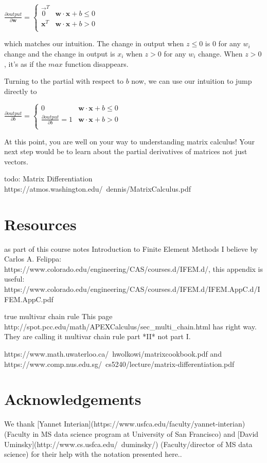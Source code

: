 \documentclass[11pt]{article}
\begin{document}
$\frac{\partial output}{\partial \mathbf{w}} = \begin{cases}
	\vec{0}^T & \mathbf{w} \cdot \mathbf{x} + b \leq 0\\
	\mathbf{x}^T & \mathbf{w} \cdot \mathbf{x} + b > 0\\
\end{cases}
$

which matches our intuition. The change in output when $z \leq 0$ is 0 for any $w_i$ change and the change in output is $x_i$ when $z > 0$ for any $w_i$ change. When $z > 0$, it's as if the $max$ function disappears. 

Turning to the partial with respect to $b$ now, we can use our intuition to jump directly to

$\frac{\partial output}{\partial b} = \begin{cases}
	0 & \mathbf{w} \cdot \mathbf{x} + b \leq 0\\
	\frac{\partial output}{\partial b} = 1 & \mathbf{w} \cdot \mathbf{x} + b > 0\\
\end{cases}
$

At this point, you are well on your way to understanding matrix calculus!  Your next step would be to learn about the partial derivatives of matrices not just vectors.

todo: Matrix Differentiation https://atmos.washington.edu/~dennis/MatrixCalculus.pdf

\section{Resources}

as part of this course notes Introduction to Finite Element Methods I believe by Carlos A. Felippa: https://www.colorado.edu/engineering/CAS/courses.d/IFEM.d/, this appendix is useful:
https://www.colorado.edu/engineering/CAS/courses.d/IFEM.d/IFEM.AppC.d/IFEM.AppC.pdf

true multivar chain rule  This page http://spot.pcc.edu/math/APEXCalculus/sec\_multi\_chain.html has right way. They are calling it multivar chain rule part *II* not part I.

https://www.math.uwaterloo.ca/~hwolkowi/matrixcookbook.pdf and  https://www.comp.nus.edu.sg/~cs5240/lecture/matrix-differentiation.pdf
 
\section{Acknowledgements}

We thank [Yannet Interian](https://www.usfca.edu/faculty/yannet-interian) (Faculty in MS data science program at University of San Francisco) and [David Uminsky](http://www.cs.usfca.edu/~duminsky/) (Faculty/director of MS data science) for their help with the notation presented here..
\end{document}
